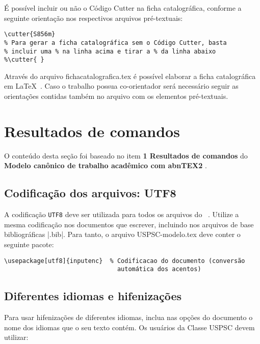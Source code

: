 É possível incluir ou não o Código Cutter na ficha catalográfica, conforme a seguinte orientação nos respectivos arquivos pré-textuais:

\begin{verbatim}
\cutter{S856m}
% Para gerar a ficha catalográfica sem o Código Cutter, basta 
% incluir uma % na linha acima e tirar a % da linha abaixo
%\cutter{ } 
\end{verbatim} 

Através do arquivo fichacatalografica.tex é possível elaborar a ficha catalográfica em \LaTeX\ . Caso o trabalho possua co-orientador será necessário seguir as orientações contidas também no arquivo com os elementos pré-textuais.	 


\section{Resultados de comandos}\label{sec-divisoes}

O conteúdo desta seção foi baseado no item \textbf{1 Resultados de comandos} do \textbf{Modelo canônico de trabalho acadêmico com abnTEX2} \cite{equipeabntex2}.

\subsection{Codificação dos arquivos: UTF8}

A codificação \texttt{UTF8} deve ser utilizada para todos os arquivos do \abnTeX\ . Utilize a mesma codificação nos documentos que escrever, incluindo nos arquivos de base bibliográficas |.bib|. Para tanto, o arquivo USPSC-modelo.tex deve conter o seguinte pacote:
\begin{verbatim}
\usepackage[utf8]{inputenc}	 % Codificacao do documento (conversão
                               automática dos acentos)
\end{verbatim}

\subsection{Diferentes idiomas e hifenizações}
\label{sec-hifenizacao}

Para usar hifenizações de diferentes idiomas, inclua nas opções do documento o
nome dos idiomas que o seu texto contém. Os usuários da Classe USPSC devem utilizar:

